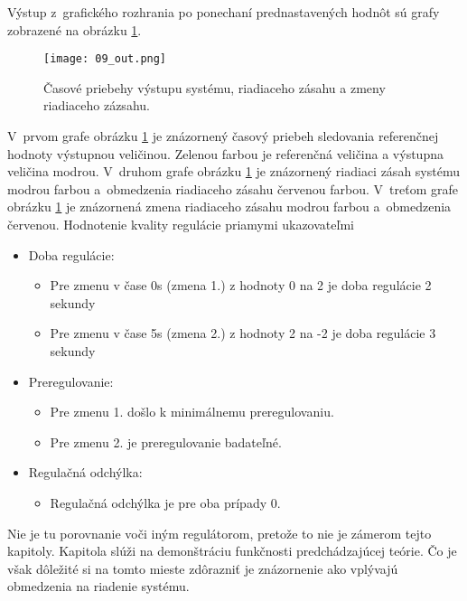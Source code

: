 Výstup z~grafického rozhrania po ponechaní prednastavených hodnôt sú grafy zobrazené na obrázku  \ref{09_out}.

\begin{figure}[!htbp]
\centering
\texttt{[image: 09\_out.png]}
\caption{Časové priebehy výstupu systému, riadiaceho zásahu a zmeny riadiaceho zázsahu.}
\label{09_out}
\end{figure}


V~prvom grafe obrázku  \ref{09_out} je znázornený časový priebeh sledovania referenčnej hodnoty výstupnou veličinou. Zelenou farbou je referenčná veličina a výstupna veličina modrou.
V~druhom grafe obrázku  \ref{09_out} je znázornený
riadiaci zásah systému modrou farbou a~obmedzenia riadiaceho zásahu červenou farbou. V~treťom grafe obrázku  \ref{09_out} je znázornená zmena riadiaceho zásahu modrou farbou
a~obmedzenia červenou. Hodnotenie kvality regulácie priamymi ukazovateľmi \cite{MPC06}

\begin{itemize}
  \item Doba regulácie:
    \begin{itemize}
  		\item
    	Pre zmenu v čase 0s (zmena 1.) z hodnoty 0 na 2 je doba regulácie 2 sekundy
    	\item
    	Pre zmenu v čase 5s (zmena 2.) z hodnoty 2 na -2 je doba regulácie 3 sekundy
	\end{itemize}
  \item Preregulovanie:
    \begin{itemize}
  		\item
    	Pre zmenu 1. došlo k minimálnemu preregulovaniu.
    	\item
    	Pre zmenu 2. je preregulovanie badateľné.
	\end{itemize}  
  \item Regulačná odchýlka:
    \begin{itemize}
  		\item
    	Regulačná odchýlka je pre oba prípady 0.
	\end{itemize}   
\end{itemize}

Nie je tu porovnanie voči iným regulátorom, pretože to nie je zámerom tejto kapitoly. Kapitola slúži na demonštráciu funkčnosti predchádzajúcej teórie. Čo je však dôležité si na tomto mieste zdôrazniť je znázornenie ako vplývajú obmedzenia na riadenie systému. 

